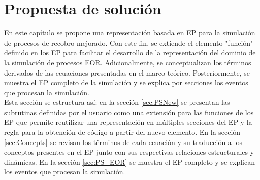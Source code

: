 \chapter{Propuesta de solución}
En este capítulo se propone una representación basada en EP para la simulación de procesos de recobro mejorado. Con este fin, se extiende el elemento "función" definido en los EP para facilitar el desarrollo de la representación del dominio de la simulación de procesos EOR. Adicionalmente, se conceptualizan los términos derivados de las ecuaciones presentadas en el marco teórico. Posteriormente, se muestra el EP completo de la simulación y se explica por secciones los eventos que procesan la simulación.\\

Esta sección se estructura así: en la sección \ref{sec:PSNew} se presentan las subrutinas definidas por el usuario como una extensión para las funciones de los EP que permite reutilizar una representación en múltiples secciones del EP y la regla para la obtención de código a partir del nuevo elemento. En la sección \ref{sec:Concepts} se revisan los términos de cada ecuación y su traducción a los conceptos presentes en el EP junto con sus respectivas relaciones estructurales y dinámicas. En la sección \ref{sec:PS_EOR} se muestra el EP completo y se explican los eventos que procesan la simulación.


